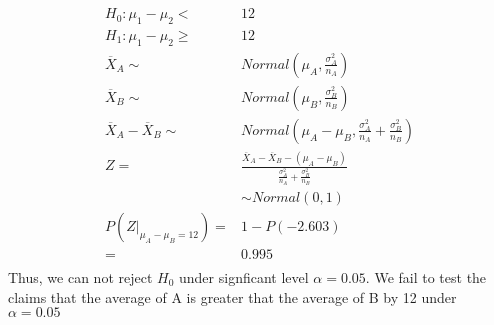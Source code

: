 \documentclass{article}
\begin{document}
    \section{}
        \paragraph{}
        \begin{equation*}
            \begin{split}
                H_0: \mu_1-\mu_2<&12\\
                H_1: \mu_1-\mu_2\geq&12\\
                \overline{X}_A\sim&Normal(\mu_A,\frac{\sigma_A^2}{n_A})\\
                \overline{X}_B\sim&Normal(\mu_B,\frac{\sigma_B^2}{n_B})\\
                \overline{X}_A-\overline{X}_B\sim&Normal(\mu_A-\mu_B,\frac{\sigma_A^2}{n_A}+\frac{\sigma_B^2}{n_B})\\
                Z=&\frac{\overline{X}_A-\overline{X}_B-(\mu_A-\mu_B)}{\frac{\sigma_A^2}{n_A}+\frac{\sigma_B^2}{n_B}}\\
                    &\sim Normal(0,1)\\
                P(Z|_{\mu_A-\mu_B=12})=&1-P(-2.603)\\
                    =&0.995\\
            \end{split}
        \end{equation*}
        Thus, we can not reject $H_0$ under signficant level $\alpha=0.05$. We fail to test the claims that the average of A is greater that the average of B by 12 under $\alpha=0.05$
\end{document}
